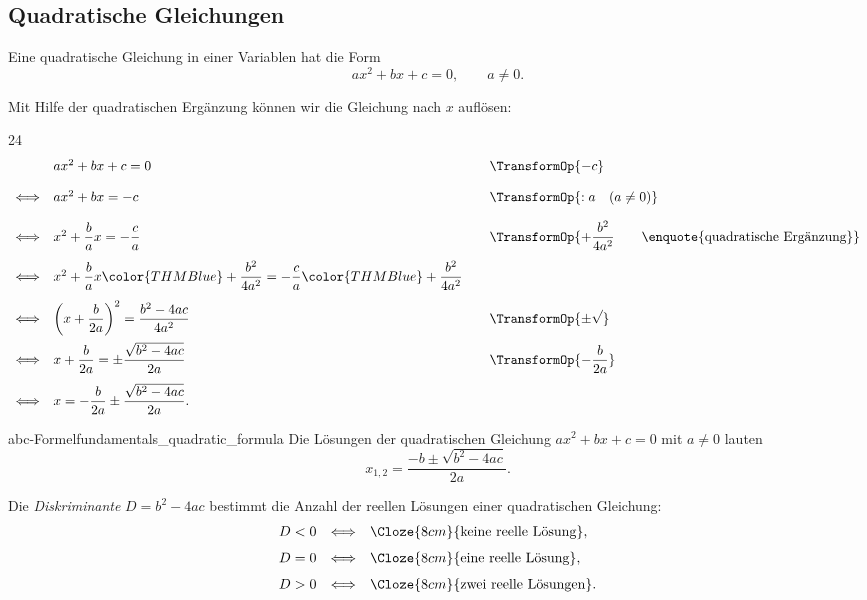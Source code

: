 \IfClozeTF{\clearpage}{\medskip}
\subsection{Quadratische Gleichungen}
\label{subsec:fundamentals_quadratic_equations}

Eine quadratische Gleichung in einer Variablen hat die Form
\[
  ax^2+bx+c=0, \qquad a\neq 0.
\]
\noindent\begin{minipage}{\linewidth}
  Mit Hilfe der quadratischen Ergänzung können wir die Gleichung nach $x$ auflösen:
  \begin{ClozeArea}[34]{24}
    \[
      \begin{array}{r@{\quad}l@{\qquad}l}
        & ax^2+bx+c=0
          & \TransformOp{-c} \\[1.1em]
        \Longleftrightarrow & ax^2+bx=-c
          & \TransformOp{:a \quad (a\neq0)} \\[1.1em]
        \Longleftrightarrow & x^2+\dfrac{b}{a}x=-\dfrac{c}{a}
          & \TransformOp{+\dfrac{b^2}{4a^2}
              \qquad\text{\enquote{quadratische Ergänzung}}} \\[1.1em]
        \Longleftrightarrow
          & x^2+\dfrac{b}{a}x{\color{THMBlue}+\dfrac{b^2}{4a^2}}
            =-\dfrac{c}{a}{\color{THMBlue}+\dfrac{b^2}{4a^2}}
          & \\[1.1em]
        \Longleftrightarrow
          & \left(x+\dfrac{b}{2a}\right)^2
            =\dfrac{b^2-4ac}{4a^2}
          & \TransformOp{\pm\sqrt{\vphantom{b^2}}} \\[1.1em]
        \Longleftrightarrow
          & x+\dfrac{b}{2a}
            =\pm\dfrac{\sqrt{b^2-4ac}}{2a}
          & \TransformOp{-\dfrac{b}{2a}} \\[1.1em]
        \Longleftrightarrow
          & x=-\dfrac{b}{2a}\pm\dfrac{\sqrt{b^2-4ac}}{2a}.
          &
      \end{array}
    \]
  \end{ClozeArea}
\end{minipage}

\begin{TheoremBox}{abc-Formel}{fundamentals_quadratic_formula}
  Die Lösungen der quadratischen Gleichung $ax^2+bx+c=0$ mit $a\neq0$ lauten
    \[
      x_{1,2}=\frac{-b\pm\sqrt{b^2-4ac}}{2a}.
    \]
\end{TheoremBox}

\begin{RemarkBox}[title=Bemerkung: Diskriminante]
  Die \emph{Diskriminante} $D=b^2-4ac$ bestimmt die Anzahl der reellen
  Lösungen einer quadratischen Gleichung:
  \[
    \begin{array}{ccl}
      D<0 &\Longleftrightarrow& \Cloze{8cm}{\text{keine reelle Lösung}},\\[0.7em]
      D=0 &\Longleftrightarrow& \Cloze{8cm}{\text{eine reelle Lösung}},\\[0.7em]
      D>0 &\Longleftrightarrow& \Cloze{8cm}{\text{zwei reelle Lösungen}}.
    \end{array}
  \]
\end{RemarkBox}

